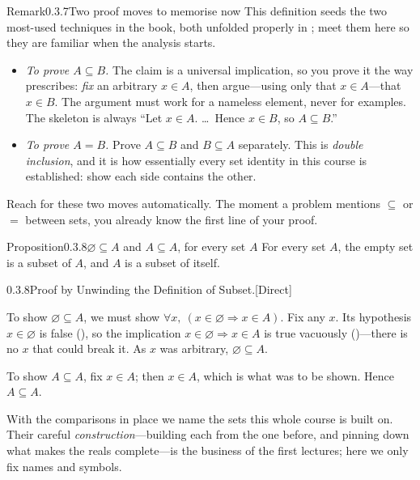 \documentclass[main.tex]{subfiles}
\begin{document}
\begin{ObjL}{Remark}{0.3.7}{Two proof moves to memorise now}
This definition seeds the two most-used techniques in the book, both unfolded properly in
; meet them here so they are familiar when the analysis starts.
\begin{itemize}
  \item \emph{To prove $A\subseteq B$.} The claim is a universal implication, so you prove it the way
         prescribes: \emph{fix} an arbitrary $x\in A$, then argue---using only that
        $x\in A$---that $x\in B$. The argument must work for a nameless element, never for examples.
        The skeleton is always ``Let $x\in A$. \dots\ Hence $x\in B$, so $A\subseteq B$.''
  \item \emph{To prove $A=B$.} Prove $A\subseteq B$ and $B\subseteq A$ separately. This is
        \emph{double inclusion}, and it is how essentially every set identity in this course is
        established: show each side contains the other.
\end{itemize}
Reach for these two moves automatically. The moment a problem mentions $\subseteq$ or $=$ between
sets, you already know the first line of your proof.
\end{ObjL}

\begin{Obj}{Proposition}{0.3.8}{$\varnothing\subseteq A$ and $A\subseteq A$, for every set $A$}
For every set $A$, the empty set is a subset of $A$, and $A$ is a subset of itself.
\end{Obj}

\begin{Prf}{0.3.8}{Proof by Unwinding the Definition of Subset.}{[Direct]}
\item To show $\varnothing\subseteq A$, we must show $\forall x,\ (x\in\varnothing\Rightarrow x\in
A)$. Fix any $x$. Its hypothesis $x\in\varnothing$ is false (), so the implication
$x\in\varnothing\Rightarrow x\in A$ is true vacuously ()---there is no $x$ that could
break it. As $x$ was arbitrary, $\varnothing\subseteq A$.
\item To show $A\subseteq A$, fix $x\in A$; then $x\in A$, which is what was to be shown. Hence
$A\subseteq A$.
\end{Prf}

\noindent With the comparisons in place we name the sets this whole course is built on. Their careful
\emph{construction}---building each from the one before, and pinning down what makes the reals
complete---is the business of the first lectures; here we only fix names and symbols.
\end{document}
